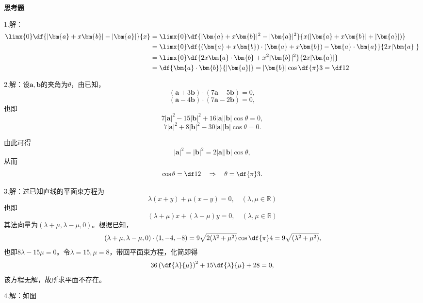 {\bf 思考题}

1.\;解：
\begin{align*}
	\limx{0}\df{|\bm{a}+x\bm{b}|-|\bm{a}|}{x}
	&=\limx{0}\df{|\bm{a}+x\bm{b}|^2-|\bm{a}|^2}{x(|\bm{a}+x\bm{b}|+|\bm{a}|)}\\
	&=\limx{0}\df{(\bm{a}+x\bm{b})\cdot(\bm{a}+x\bm{b})
	-\bm{a}\cdot\bm{a}}{2x|\bm{a}|}\\
	&=\limx{0}\df{2x\bm{a}\cdot\bm{b}+x^2|\bm{b}|^2}{2x|\bm{a}|}\\
	&=\df{\bm{a}\cdot\bm{b}}{|\bm{a}|}=|\bm{b}|\cos\df{\pi}3=\df12
\end{align*}

2.\;解：设$\bm{a},\bm{b}$的夹角为$\theta$，由已知，
$$(\bm{a}+3\bm{b})\cdot(7\bm{a}-5\bm{b})=0,$$
$$(\bm{a}-4\bm{b})\cdot(7\bm{a}-2\bm{b})=0,$$
也即
$$7|\bm{a}|^2-15|\bm{b}|^2+16|\bm{a}||\bm{b}|\cos\theta=0,$$
$$7|\bm{a}|^2+8|\bm{b}|^2-30|\bm{a}||\bm{b}|\cos\theta=0.$$

由此可得
$$|\bm{a}|^2=|\bm{b}|^2=2|\bm{a}||\bm{b}|\cos\theta,$$
从而
$$\cos\theta=\df12\quad\Rightarrow\quad\theta=\df{\pi}3.$$

3.解：过已知直线的平面束方程为
$$\lambda(x+y)+\mu(x-y)=0,\quad(\lambda,\mu\in\mathbb{R})$$
也即
$$(\lambda+\mu)x+(\lambda-\mu)y=0,\quad(\lambda,\mu\in\mathbb{R})$$
其法向量为$(\lambda+\mu,\lambda-\mu,0)$。根据已知，
$$(\lambda+\mu,\lambda-\mu,0)\cdot(1,-4,-8)
=9\sqrt{2(\lambda^2+\mu^2)}\cos\df{\pi}4=9\sqrt{(\lambda^2+\mu^2)},$$
也即$8\lambda-15\mu=0$。令$\lambda=15,\mu=8$，带回平面束方程，化简即得
$$36\left(\df{\lambda}{\mu}\right)^2+15\df{\lambda}{\mu}+28=0,$$
该方程无解，故所求平面不存在。

4.\;解：如图
\begin{center}
\end{center}

